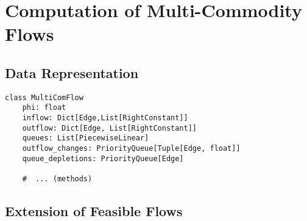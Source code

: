\section{Computation of Multi-Commodity Flows}

\subsection{Data Representation}


\begin{algorithm}
    \begin{verbatim}
class MultiComFlow
    phi: float
    inflow: Dict[Edge,List[RightConstant]]
    outflow: Dict[Edge, List[RightConstant]]
    queues: List[PiecewiseLinear]
    outflow_changes: PriorityQueue[Tuple[Edge, float]]
    queue_depletions: PriorityQueue[Edge]

    #  ... (methods)
    \end{verbatim}
\end{algorithm}




\subsection{Extension of Feasible Flows}


